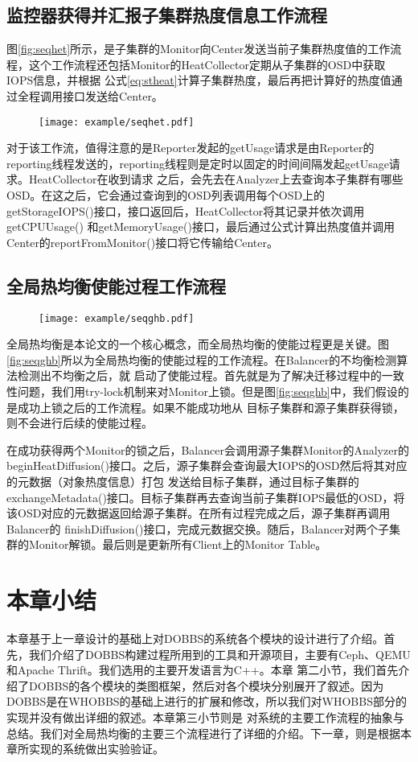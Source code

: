 \subsection{监控器获得并汇报子集群热度信息工作流程}
图\ref{fig:seqhet}所示，是子集群的Monitor向Center发送当前子集群热度值的工作流程，这个工作流程还包括Monitor的HeatCollector定期从子集群的OSD中获取IOPS信息，并根据
公式\ref{eq:stheat}计算子集群热度，最后再把计算好的热度值通过全程调用接口发送给Center。
\begin{figure}[!htp]
    \centering
    \texttt{[image: example/seqhet.pdf]}
\end{figure}
对于该工作流，值得注意的是Reporter发起的getUsage请求是由Reporter的reporting线程发送的，reporting线程则是定时以固定的时间间隔发起getUsage请求。HeatCollector在收到请求
之后，会先去在Analyzer上去查询本子集群有哪些OSD。在这之后，它会通过查询到的OSD列表调用每个OSD上的getStorageIOPS()接口，接口返回后，HeatCollector将其记录并依次调用getCPUUsage()
和getMemoryUsage()接口，最后通过公式计算出热度值并调用Center的reportFromMonitor()接口将它传输给Center。

\subsection{全局热均衡使能过程工作流程}
\begin{figure}[!htp]
    \centering
    \texttt{[image: example/seqghb.pdf]}
\end{figure}

全局热均衡是本论文的一个核心概念，而全局热均衡的使能过程更是关键。图\ref{fig:seqghb}所以为全局热均衡的使能过程的工作流程。在Balancer的不均衡检测算法检测出不均衡之后，就
启动了使能过程。首先就是为了解决迁移过程中的一致性问题，我们用try-lock机制来对Monitor上锁。但是图\ref{fig:seqghb}中，我们假设的是成功上锁之后的工作流程。如果不能成功地从
目标子集群和源子集群获得锁，则不会进行后续的使能过程。

在成功获得两个Monitor的锁之后，Balancer会调用源子集群Monitor的Analyzer的beginHeatDiffusion()接口。之后，源子集群会查询最大IOPS的OSD然后将其对应的元数据（对象热度信息）打包
发送给目标子集群，通过目标子集群的exchangeMetadata()接口。目标子集群再去查询当前子集群IOPS最低的OSD，将该OSD对应的元数据返回给源子集群。在所有过程完成之后，源子集群再调用Balancer的
finishDiffusion()接口，完成元数据交换。随后，Balancer对两个子集群的Monitor解锁。最后则是更新所有Client上的Monitor Table。

\section{本章小结}
本章基于上一章设计的基础上对DOBBS的系统各个模块的设计进行了介绍。首先，我们介绍了DOBBS构建过程所用到的工具和开源项目，主要有Ceph、QEMU和Apache Thrift。我们选用的主要开发语言为C++。本章
第二小节，我们首先介绍了DOBBS的各个模块的类图框架，然后对各个模块分别展开了叙述。因为DOBBS是在WHOBBS的基础上进行的扩展和修改，所以我们对WHOBBS部分的实现并没有做出详细的叙述。本章第三小节则是
对系统的主要工作流程的抽象与总结。我们对全局热均衡的主要三个流程进行了详细的介绍。下一章，则是根据本章所实现的系统做出实验验证。

